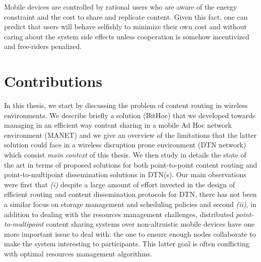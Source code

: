 Mobile devices are controlled by rational users who are aware of the energy constraint and the cost to share and replicate content. Given this fact, one can predict that users will behave selfishly to minimize their own cost and without caring about the system side effects unless cooperation is somehow incentivized and free-riders penalized. 

\section{Contributions}

In this thesis, we start by discussing the problem of content routing in wireless environments. We describe briefly a solution (BitHoc) that we developed towards managing in an efficient way content sharing in a mobile Ad Hoc network environment (MANET) and we give an overview of the limitations that the latter solution could face in a wireless disruption prone environment (DTN network) which consist \emph{main context} of this thesis. We then study in details the state of the art in terms of proposed solutions for both point-to-point content routing and point-to-multipoint dissemination solutions in DTN(s). Our main observations were first that \emph{(i)} despite a large amount of effort invested in the design of efficient routing and content dissemination protocols for DTN, there has not been a similar focus on storage management and scheduling policies and second \emph{(ii)}, in addition to dealing with the resources management challenges, distributed \emph{point-to-multipoint} content sharing systems over non-altruistic mobile devices have one more important issue to deal with: the one to ensure enough nodes collaborate to make the system interesting to participants. This latter goal is often conflicting with optimal resources management algorithms. 

